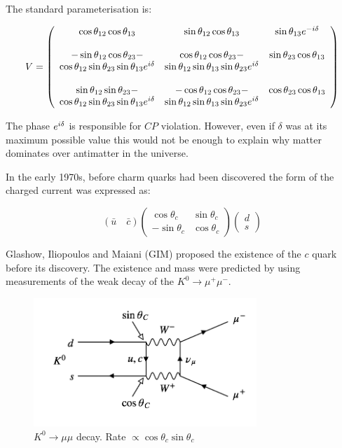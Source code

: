 The standard parameterisation is:

\[
  V = 
  \left(
  \begin{array}{ccc}
    \cos\theta_{12}\cos\theta_{13} & \sin\theta_{12}\cos\theta_{13} & \sin\theta_{13}e^{-i\delta} \\
    &&\\
    -\sin\theta_{12}\cos\theta_{23} -  & \cos\theta_{12}\cos\theta_{23} - & \sin\theta_{23}\cos\theta_{13} \\
    \cos\theta_{12}\sin\theta_{23}\sin\theta_{13}e^{i\delta} & \sin\theta_{12}\sin\theta_{13}\sin\theta_{23}e^{i\delta} & \\
    &&\\
    \sin\theta_{12}\sin\theta_{23} - & -\cos\theta_{12}\cos\theta_{23} - & \cos\theta_{23}\cos\theta_{13} \\
    \cos\theta_{12}\sin\theta_{23}\sin\theta_{13}e^{i\delta} & \sin\theta_{12}\sin\theta_{13}\sin\theta_{23}e^{i\delta} &\\
  \end{array}
  \right)
\]

The phase $e^{i\delta}$ is responsible for $CP$ violation.  However, even if $\delta$ was at its maximum possible value this would not be enough to explain why matter dominates over antimatter in the universe.

In the early 1970s, before charm quarks had been discovered the form of the charged current was expressed as:

\[
  \left(\bar{u} \quad \bar{c}\right)
  \left(
  \begin{array}{cc}
    \cos\theta_c  & \sin\theta_c \\
    -\sin\theta_c & \cos\theta_c
  \end{array}
  \right)
  \left(
  \begin{array}{c}
    d \\
    s
  \end{array}
  \right)
\]

Glashow, Iliopoulos and Maiani (GIM) proposed the existence of the $c$ quark before its discovery.  The existence and mass were predicted by using measurements of the weak decay of the $K^0 \to \mu^+ \mu^-$.

\begin{figure}[!htb]
  \begin{center}
    \includegraphics[width=0.75\textwidth]{images/web_feynman/image_49.png}
    \caption[$K^0\to\mu\mu$ decay]{$K^0\to\mu\mu$ decay.  Rate $\propto \cos\theta_c\sin\theta_c$}
    \label{fig:ch12_K0ToMuMu}
  \end{center}
\end{figure}

